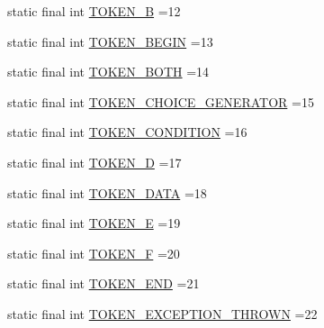\begin{DoxyCompactItemize}
\item 
static final int \hyperlink{classgov_1_1nasa_1_1jpf_1_1inspector_1_1server_1_1expression_1_1parser_1_1_expression_grammar_parser_a0dbbf81a278938ea7957cdbc6f422ccc}{T\+O\+K\+E\+N\+\_\+B} =12
\item 
static final int \hyperlink{classgov_1_1nasa_1_1jpf_1_1inspector_1_1server_1_1expression_1_1parser_1_1_expression_grammar_parser_aeb1f6ac15295275b80fae4b59d753627}{T\+O\+K\+E\+N\+\_\+\+B\+E\+G\+IN} =13
\item 
static final int \hyperlink{classgov_1_1nasa_1_1jpf_1_1inspector_1_1server_1_1expression_1_1parser_1_1_expression_grammar_parser_adb1cf23ee91ded4bcbbba7860c7e27ff}{T\+O\+K\+E\+N\+\_\+\+B\+O\+TH} =14
\item 
static final int \hyperlink{classgov_1_1nasa_1_1jpf_1_1inspector_1_1server_1_1expression_1_1parser_1_1_expression_grammar_parser_ac0d2665fc7992bfe9d6c3ee0b13a24b2}{T\+O\+K\+E\+N\+\_\+\+C\+H\+O\+I\+C\+E\+\_\+\+G\+E\+N\+E\+R\+A\+T\+OR} =15
\item 
static final int \hyperlink{classgov_1_1nasa_1_1jpf_1_1inspector_1_1server_1_1expression_1_1parser_1_1_expression_grammar_parser_aa6995595ef5a922f018d493b1a9ecd01}{T\+O\+K\+E\+N\+\_\+\+C\+O\+N\+D\+I\+T\+I\+ON} =16
\item 
static final int \hyperlink{classgov_1_1nasa_1_1jpf_1_1inspector_1_1server_1_1expression_1_1parser_1_1_expression_grammar_parser_af4891c63d93fac0f017d24badd90a0e8}{T\+O\+K\+E\+N\+\_\+D} =17
\item 
static final int \hyperlink{classgov_1_1nasa_1_1jpf_1_1inspector_1_1server_1_1expression_1_1parser_1_1_expression_grammar_parser_a289e5f1af08e9240fa2dffa5ffb9bb22}{T\+O\+K\+E\+N\+\_\+\+D\+A\+TA} =18
\item 
static final int \hyperlink{classgov_1_1nasa_1_1jpf_1_1inspector_1_1server_1_1expression_1_1parser_1_1_expression_grammar_parser_a425d8c840cbe334424d42ce5d9173703}{T\+O\+K\+E\+N\+\_\+E} =19
\item 
static final int \hyperlink{classgov_1_1nasa_1_1jpf_1_1inspector_1_1server_1_1expression_1_1parser_1_1_expression_grammar_parser_a0b66750a393219ea58e6cf4374929e65}{T\+O\+K\+E\+N\+\_\+F} =20
\item 
static final int \hyperlink{classgov_1_1nasa_1_1jpf_1_1inspector_1_1server_1_1expression_1_1parser_1_1_expression_grammar_parser_a33a806b8ed847eb31c5b5799e00c0def}{T\+O\+K\+E\+N\+\_\+\+E\+ND} =21
\item 
static final int \hyperlink{classgov_1_1nasa_1_1jpf_1_1inspector_1_1server_1_1expression_1_1parser_1_1_expression_grammar_parser_a665a72d407740500484f11cf7d81eaf9}{T\+O\+K\+E\+N\+\_\+\+E\+X\+C\+E\+P\+T\+I\+O\+N\+\_\+\+T\+H\+R\+O\+WN} =22

\end{DoxyCompactItemize}
